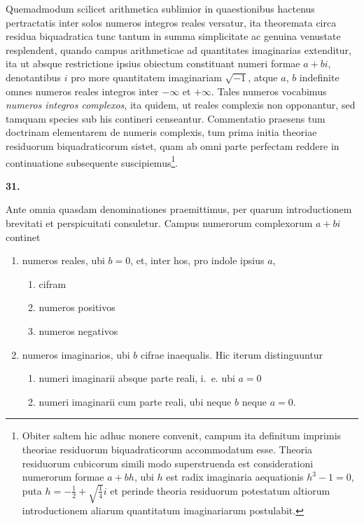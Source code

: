 \documentclass[12pt,a4paper]{article}
\newcommand{\art}[1]{\begin{center}\textbf{#1.}\end{center}}
\begin{document}
Quemadmodum scilicet arithmetica sublimior in quaestionibus hactenus pertractatis inter solos numeros integros reales versatur, ita theoremata circa residua biquadratica tunc tantum in summa simplicitate ac genuina venustate resplendent, quando campus arithmeticae ad quantitates imaginarias extenditur, ita ut absque restrictione ipsius obiectum constituant numeri formae $a+bi$, denotantibus $i$ pro more quantitatem imaginariam $\sqrt{-1}$, atque $a$, $b$ indefinite omnes numeros reales integros inter $-\infty$ et $+\infty$. Tales numeros vocabimus \textit{numeros integros complexos}, ita quidem, ut reales complexis non opponantur, sed tamquam species sub his contineri censeantur. Commentatio praesens tum doctrinam elementarem de numeris complexis, tum prima initia theoriae residuorum biquadraticorum sistet, quam ab omni parte perfectam reddere in continuatione subsequente suscipiemus\footnote{Obiter saltem hic adhuc monere convenit, campum ita definitum imprimis theoriae residuorum biquadraticorum accommodatum esse. Theoria residuorum cubicorum simili modo superstruenda est considerationi numerorum formae $a+bh$, ubi $h$ est radix imaginaria aequationis $h^3-1=0$, puta $h=-\frac{1}{2}+\sqrt{\frac{1}{4}}i$ et perinde theoria residuorum potestatum altiorum introductionem aliarum quantitatum imaginariarum postulabit.}.

\art{31}

Ante omnia quasdam denominationes praemittimus, per quarum introductionem brevitati et perspicuitati consuletur. Campus numerorum complexorum $a+bi$ continet

\begin{enumerate}[label=\Roman*.]
\item numeros reales, ubi $b=0$, et, inter hos, pro indole ipsius $a$,
    \begin{enumerate}[label=\arabic*)]
    \item cifram
    \item numeros positivos
    \item numeros negativos
    \end{enumerate}
\item numeros imaginarios, ubi $b$ cifrae inaequalis. Hic iterum distinguuntur
    \begin{enumerate}[label=\arabic*)]
    \item numeri imaginarii absque parte reali, i.~e. ubi $a=0$
    \item numeri imaginarii cum parte reali, ubi neque $b$ neque $a=0$.
    \end{enumerate}
\end{enumerate}
\end{document}
